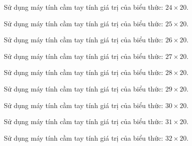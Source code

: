 \begin{ex}
  Sử dụng máy tính cầm tay tính giá trị của biểu thức: $24 \times 20$.
\end{ex}

\begin{ex}
  Sử dụng máy tính cầm tay tính giá trị của biểu thức: $25 \times 20$.
\end{ex}

\begin{ex}
  Sử dụng máy tính cầm tay tính giá trị của biểu thức: $26 \times 20$.
\end{ex}

\begin{ex}
  Sử dụng máy tính cầm tay tính giá trị của biểu thức: $27 \times 20$.
\end{ex}

\begin{ex}
  Sử dụng máy tính cầm tay tính giá trị của biểu thức: $28 \times 20$.
\end{ex}

\begin{ex}
  Sử dụng máy tính cầm tay tính giá trị của biểu thức: $29 \times 20$.
\end{ex}

\begin{ex}
  Sử dụng máy tính cầm tay tính giá trị của biểu thức: $30 \times 20$.
\end{ex}

\begin{ex}
  Sử dụng máy tính cầm tay tính giá trị của biểu thức: $31 \times 20$.
\end{ex}

\begin{ex}
  Sử dụng máy tính cầm tay tính giá trị của biểu thức: $32 \times 20$.
\end{ex}

